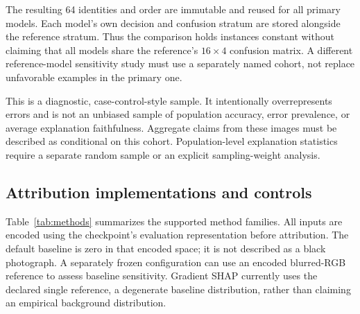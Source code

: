 \documentclass[conference,10pt,letterpaper]{IEEEtran}
\begin{document}
The resulting 64 identities and order are immutable and reused for all primary models. Each model's own decision and confusion stratum are stored alongside the reference stratum. Thus the comparison holds instances constant without claiming that all models share the reference's $16\times4$ confusion matrix. A different reference-model sensitivity study must use a separately named cohort, not replace unfavorable examples in the primary one.

This is a diagnostic, case-control-style sample. It intentionally overrepresents errors and is not an unbiased sample of population accuracy, error prevalence, or average explanation faithfulness. Aggregate claims from these images must be described as conditional on this cohort. Population-level explanation statistics require a separate random sample or an explicit sampling-weight analysis.

\subsection{Attribution implementations and controls}
Table~\ref{tab:methods} summarizes the supported method families. All inputs are encoded using the checkpoint's evaluation representation before attribution. The default baseline is zero in that encoded space; it is not described as a black photograph. A separately frozen configuration can use an encoded blurred-RGB reference to assess baseline sensitivity. Gradient SHAP currently uses the declared single reference, a degenerate baseline distribution, rather than claiming an empirical background distribution.
\end{document}
